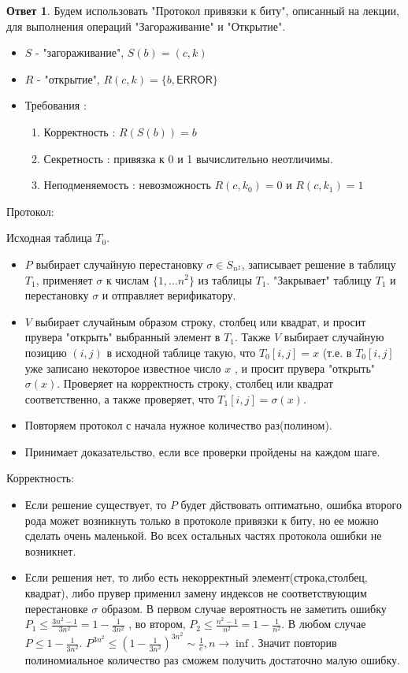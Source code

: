 \documentclass[a4paper]{article}
\theoremstyle{plain}
\theoremstyle{definition}
\newtheorem*{answer}{Ответ}
\begin{document}
\begin{answer} Будем использовать "Протокол привязки к биту", описанный на лекции, для выполнения операций "Загораживание" и "Открытие".
\begin{itemize}
\item $S$ - "загораживание", $S(b) = (c,k)$
\item $R$ - "открытие", $R(c,k) = \{b, \textsf{ERROR}\}$
\item Требования :
    \begin{enumerate}
        \item Корректность : $R(S(b)) = b$
        \item Секретность : привязка к 0 и 1 вычислительно неотличимы.
        \item Неподменяемость : невозможность $R(c,k_0) = 0$ и  $R(c,k_1) = 1$
    \end{enumerate}
\end{itemize} 
\textsf{Протокол:}

Исходная таблица $T_0$. 
\begin{itemize}
    \item $P$ выбирает случайную перестановку $\sigma \in S_{n^2}$, записывает решение в таблицу $T_1$, применяет $\sigma$ к числам $\{1,\ldots n^2\}$ из таблицы $T_1$. "Закрывает" таблицу $T_1$ и перестановку $\sigma$ и отправляет верификатору.
    \item $V$ выбирает случайным образом строку, столбец или квадрат, и просит прувера "открыть" выбранный элемент в $T_1$. Также $V$ выбирает случайную позицию $(i,j)$ в исходной таблице такую, что $T_0[i,j] = x$ (т.е. в $T_0[i,j]$ уже записано некоторое известное число $x$ , и просит прувера "открыть" $\sigma (x)$. Проверяет на корректность строку, столбец или квадрат соответственно, а также проверяет, что $T_1[i,j] = \sigma(x)$.
    \item Повторяем протокол с начала нужное количество раз(полином).
    \item Принимает доказательство, если все проверки пройдены на каждом шаге.
\end{itemize}
Корректность: \\
\begin{itemize}
\item Если решение существует, то $P$ будет дйствовать оптиматьно, ошибка второго рода может возникнуть только в протоколе привязки к биту, но ее можно сделать очень маленькой. Во всех остальных частях протокола ошибки не возникнет.
\item Если решения нет, то либо есть некорректный элемент(строка,столбец, квадрат), либо прувер применил замену индексов не соответствующим перестановке $\sigma$ образом. В первом случае вероятность не заметить ошибку
 $P_{1} \leq \frac{3n^2 - 1}{3n^2} = 1 - \frac{1}{3n^2}$ , во втором, $P_2 \leq \frac{n^2 - 1}{n^2} = 1 - \frac{1}{n^2}$. В любом случае $P \leq 1 - \frac{1}{3n^2}$. $P^{3n^2} \leq (1 - \frac{1}{3n^2})^{3n^2} \sim \frac{1}{e} , n \to \inf $. Значит повторив полиномиальное количество раз сможем получить достаточно малую ошибку.
\end{itemize}
\end{answer}
\end{document}
